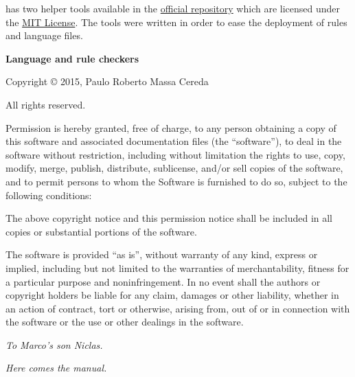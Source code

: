 \documentclass[a4paper,twoside,12pt]{memoir}
\begin{document}
{\ornamentline

\vspace{1em}

\arara has two helper tools available in the \href{https://github.com/cereda/arara}{official repository} which are licensed under the \href{http://opensource.org/licenses/MIT}{MIT License}. The tools were written in order to ease the deployment of rules and language files.

\vspace{1.5em}

{\sffamily\bfseries Language and rule checkers}

Copyright \copyright{} 2015, Paulo Roberto Massa Cereda

All rights reserved.

\vspace{1em}

Permission is hereby granted, free of charge, to any person obtaining a copy of this software and associated documentation files (the ``software''), to deal in the software without restriction, including without limitation the rights to use, copy, modify, merge, publish, distribute, sublicense, and/or sell copies of the software, and to permit persons to whom the Software is furnished to do so, subject to the following conditions:

\vspace{1em}

The above copyright notice and this permission notice shall be included in all copies or substantial portions of the software.

\vspace{1em}

The software is provided ``as is'', without warranty of any kind, express or implied, including but not limited to the warranties of merchantability, fitness for a particular purpose and noninfringement. In no event shall the authors or copyright holders be liable for any claim, damages or other liability, whether in an action of contract, tort or otherwise, arising from, out of or in connection with the software or the use or other dealings in the software.

\ornamentline}

\cleardoublepage

\vspace*{25em}

\begin{flushright}
\em To Marco's son Niclas.
\end{flushright}

\cleardoublepage

\tableofcontents*

\cleardoublepage

\listoffigures*

\cleardoublepage

\listoftables*

\cleardoublepage

\listofcodes*

\mainmatter

\emph{Here comes the manual.}
\end{document}

